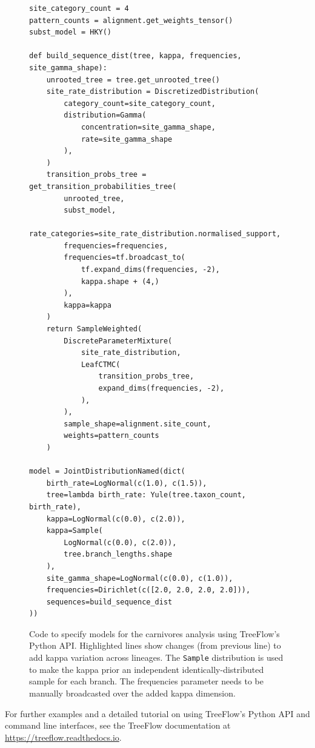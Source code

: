 \documentclass[12pt]{article}
\begin{document}
\begin{figure}[ht]
    \begin{verbatim}
site_category_count = 4
pattern_counts = alignment.get_weights_tensor()
subst_model = HKY()

def build_sequence_dist(tree, kappa, frequencies, site_gamma_shape):
    unrooted_tree = tree.get_unrooted_tree()
    site_rate_distribution = DiscretizedDistribution(
        category_count=site_category_count,
        distribution=Gamma(
            concentration=site_gamma_shape,
            rate=site_gamma_shape
        ),
    )
    transition_probs_tree = get_transition_probabilities_tree(
        unrooted_tree,
        subst_model,
        rate_categories=site_rate_distribution.normalised_support,
        frequencies=frequencies,
        frequencies=tf.broadcast_to(
            tf.expand_dims(frequencies, -2),
            kappa.shape + (4,)
        ),
        kappa=kappa
    )
    return SampleWeighted(
        DiscreteParameterMixture(
            site_rate_distribution,
            LeafCTMC(
                transition_probs_tree,
                expand_dims(frequencies, -2),
            ),
        ),
        sample_shape=alignment.site_count,
        weights=pattern_counts
    )

model = JointDistributionNamed(dict(
    birth_rate=LogNormal(c(1.0), c(1.5)),
    tree=lambda birth_rate: Yule(tree.taxon_count, birth_rate),
    kappa=LogNormal(c(0.0), c(2.0)),
    kappa=Sample(
        LogNormal(c(0.0), c(2.0)),
        tree.branch_lengths.shape
    ),
    site_gamma_shape=LogNormal(c(0.0), c(1.0)),
    frequencies=Dirichlet(c([2.0, 2.0, 2.0, 2.0])),
    sequences=build_sequence_dist
))
    \end{verbatim}
    \caption{Code to specify models for the carnivores analysis using TreeFlow's Python API. Highlighted lines show changes (from previous line) to add kappa variation across lineages. The \texttt{Sample} distribution is used to make the kappa prior an independent identically-distributed sample for each branch. The frequencies parameter needs to be manually broadcasted over the added kappa dimension.}
    \label{fig:carnivorescode}
\end{figure}

For further examples and a detailed tutorial on using TreeFlow's Python API and command line interfaces, see the TreeFlow documentation at \url{https://treeflow.readthedocs.io}.
\end{document}
